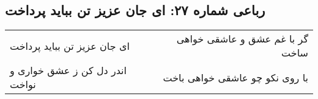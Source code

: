 \begin{center}
\section*{رباعی شماره ۲۷: ای جان عزیز تن بباید پرداخت}
\label{sec:sh027}
\begin{longtable}{l p{0.5cm} r}
ای جان عزیز تن بباید پرداخت
&&
گر با غم عشق و عاشقی خواهی ساخت
\\
اندر دل کن ز عشق خواری و نواخت
&&
با روی نکو چو عاشقی خواهی باخت
\\
\end{longtable}
\end{center}
